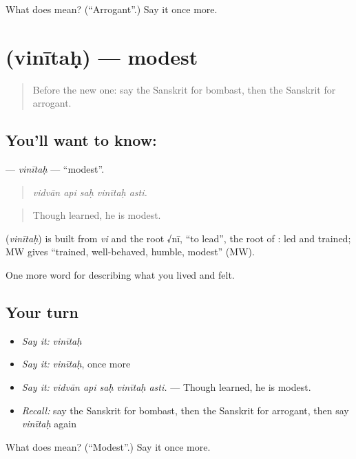 \begin{tcolorbox}[breakable,colback=teal!4,colframe=teal!35!black,title={Before you move on}]
What does  mean? (\textquotedblleft{}Arrogant\textquotedblright{}.) Say it once more.
\end{tcolorbox}
\section[\texorpdfstring{\sk{विनीतः} (vinītaḥ)}{विनीतः (vinītaḥ)}]{ (vinītaḥ) — modest}

\label{lesson:SA-C458-vinitah}



\begin{quote}
Before the new one: say the Sanskrit for bombast, then the Sanskrit for arrogant.
\end{quote}

\subsection*{You'll want to know: }
\textbf{} — \emph{vinītaḥ} — \textquotedblleft{}modest\textquotedblright{}.

\begin{quote}
    
\end{quote}

\begin{quote}
\emph{vidvān api saḥ vinītaḥ asti.}
\end{quote}

\begin{quote}
Though learned, he is modest.
\end{quote}

\begin{cousinweb}
\textbf{} (\emph{vinītaḥ}) is built from \emph{vi} and the root √nī, \textquotedblleft{}to lead\textquotedblright{}, the root of \textbf{}: led and trained; MW gives \textquotedblleft{}trained, well-behaved, humble, modest\textquotedblright{} (MW).
\end{cousinweb}

\begin{grammarlens}[title={What you've built}]
One more word for describing what you lived and felt.
\end{grammarlens}

\subsection*{Your turn}
\begin{itemize}
\raggedright
  \item \emph{Say it:} \emph{vinītaḥ}
  \item \emph{Say it:} \emph{vinītaḥ}, once more
  \item \emph{Say it:} \emph{vidvān api saḥ vinītaḥ asti.} — Though learned, he is modest.
  \item \emph{Recall:} say the Sanskrit for bombast, then the Sanskrit for arrogant, then say \emph{vinītaḥ} again
\end{itemize}

\begin{tcolorbox}[breakable,colback=teal!4,colframe=teal!35!black,title={Before you move on}]
What does  mean? (\textquotedblleft{}Modest\textquotedblright{}.) Say it once more.
\end{tcolorbox}
